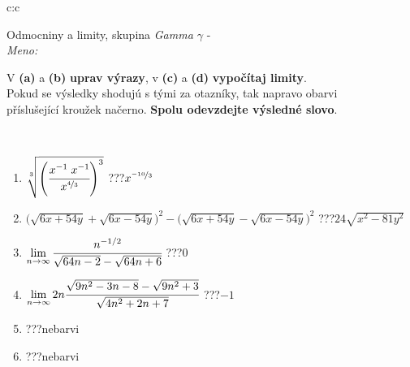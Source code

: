\documentclass[10pt]{report}
\begin{document}
\newpage
\thispagestyle{empty}
\begin{tabular}{c:c}
\begin{minipage}[c][104.5mm][t]{0.5\linewidth}
\begin{center}
\vspace{7mm}
{\huge Odmocniny a limity, skupina \textit{Gamma $\gamma$} -}\\[5mm]
\textit{Meno:}\phantom{xxxxxxxxxxxxxxxxxxxxxxxxxxxxxxxxxxxxxxxxxxxxxxxxxxxxxxxxxxxxxxxxx}\\[5mm]
\begin{minipage}{0.95\linewidth}
\begin{center}
V \textbf{(a)} a \textbf{(b)} \textbf{uprav výrazy}, v \textbf{(c)} a \textbf{(d)} \textbf{vypočítaj limity}.\\Pokud se výsledky shodujú s tými za otazníky, tak napravo obarvi\\příslušející kroužek načerno. \textbf{Spolu odevzdejte výsledné slovo}.
\end{center}
\end{minipage}
\\[1mm]
\begin{minipage}{0.79\linewidth}
\begin{center}
\begin{varwidth}{\linewidth}
\begin{enumerate}
\small
\item $\sqrt[3]{\left(\cfrac{x^{-1}\;x^{-1}}{x^{\nicefrac{4}{3}}}\right)^{3}}$\quad \dotfill\; ???\;\dotfill \quad $x^{\nicefrac{-10}{3}}$
\item {\footnotesize{\scriptsize$\big(\sqrt{6x+54y}+\sqrt{6x-54y}\big)^2-\big(\sqrt{6x+54y}-\sqrt{6x-54y}\big)^2$}\quad \dotfill\; ???\;\dotfill \quad $24\sqrt{x^2-81y^2}$}
\item $\lim\limits_{n\to\infty}\cfrac{n^{-1/2}}{\sqrt{64n-2}-\sqrt{64n+6}}$\quad \dotfill\; ???\;\dotfill \quad $0$
\item $\lim\limits_{n\to\infty}2n\cfrac{\sqrt{9n^2-3n-8}-\sqrt{9n^2+3}}{\sqrt{4n^2+2n+7}}$\quad \dotfill\; ???\;\dotfill \quad $-1$
\item \quad \dotfill\; ???\;\dotfill \quad nebarvi
\item \quad \dotfill\; ???\;\dotfill \quad nebarvi
\end{enumerate}
\end{varwidth}
\end{center}
\end{minipage}
\begin{minipage}{0.20\linewidth}

\end{minipage}
\end{center}
\end{minipage}
\end{tabular}
\end{document}
